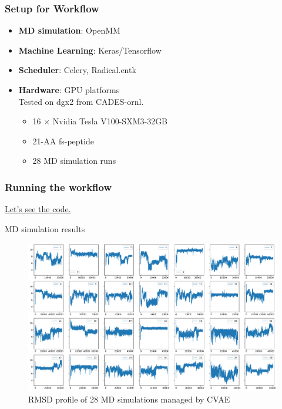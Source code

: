 \documentclass{beamer}
\begin{document}
\begin{frame}
\frametitle{Setup for Workflow} 
\begin{itemize}
	\item \textbf{MD simulation}: OpenMM   \\
	\item \textbf{Machine Learning}: Keras/Tensorflow \\
	\item \textbf{Scheduler}: Celery, Radical.entk
	\item \textbf{Hardware}: GPU platforms \\ 
	\vspace{.3cm}
	Tested on dgx2 from CADES-ornl. \\
	\begin{itemize}
		\item 16 $\times$ Nvidia Tesla V100-SXM3-32GB 
		\item 21-AA fs-peptide 
		\item 28 MD simulation runs
	\end{itemize}
\end{itemize}
\end{frame} 

\begin{frame}
\frametitle{Running the workflow} 
\href{./Figures/CVAE_MD.html}{Let's see the code. } 
\end{frame} 


\begin{frame}{MD simulation results} 
\begin{figure}
	\includegraphics[width=\textwidth]{Figures/RMSD_MD.png} 
	\caption{RMSD profile of 28 MD simulations managed by CVAE} 
\end{figure} 
\end{frame} 
\end{document}
